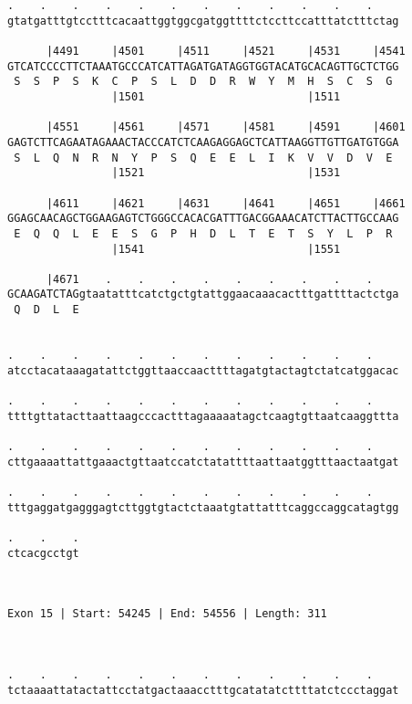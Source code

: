 \documentclass{article}
\begin{document}
\begin{Verbatim}
.    .    .    .    .    .    .    .    .    .    .    .    
gtatgatttgtcctttcacaattggtggcgatggttttctccttccatttatctttctag
                                                            
      |4491     |4501     |4511     |4521     |4531     |4541
GTCATCCCCTTCTAAATGCCCATCATTAGATGATAGGTGGTACATGCACAGTTGCTCTGG
 S  S  P  S  K  C  P  S  L  D  D  R  W  Y  M  H  S  C  S  G 
                |1501                         |1511         
  
      |4551     |4561     |4571     |4581     |4591     |4601
GAGTCTTCAGAATAGAAACTACCCATCTCAAGAGGAGCTCATTAAGGTTGTTGATGTGGA
 S  L  Q  N  R  N  Y  P  S  Q  E  E  L  I  K  V  V  D  V  E 
                |1521                         |1531         
  
      |4611     |4621     |4631     |4641     |4651     |4661
GGAGCAACAGCTGGAAGAGTCTGGGCCACACGATTTGACGGAAACATCTTACTTGCCAAG
 E  Q  Q  L  E  E  S  G  P  H  D  L  T  E  T  S  Y  L  P  R 
                |1541                         |1551         
  
      |4671    .    .    .    .    .    .    .    .    .    
GCAAGATCTAGgtaatatttcatctgctgtattggaacaaacactttgattttactctga
 Q  D  L  E                                                 
                                                            
  
.    .    .    .    .    .    .    .    .    .    .    .    
atcctacataaagatattctggttaaccaacttttagatgtactagtctatcatggacac
                                                            
.    .    .    .    .    .    .    .    .    .    .    .    
ttttgttatacttaattaagcccactttagaaaaatagctcaagtgttaatcaaggttta
                                                            
.    .    .    .    .    .    .    .    .    .    .    .    
cttgaaaattattgaaactgttaatccatctatattttaattaatggtttaactaatgat
                                                            
.    .    .    .    .    .    .    .    .    .    .    .    
tttgaggatgagggagtcttggtgtactctaaatgtattatttcaggccaggcatagtgg
                                                            
.    .    .
ctcacgcctgt
           
           
 
Exon 15 | Start: 54245 | End: 54556 | Length: 311



.    .    .    .    .    .    .    .    .    .    .    .    
tctaaaattatactattcctatgactaaacctttgcatatatcttttatctccctaggat
                                                            

\end{Verbatim}
\end{document}
